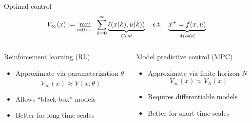 \documentclass[xcolor=dvipsnames,aspectratio=169]{beamer}
\begin{document}
\begin{frame}{Optimal control}
	\begin{equation*}
		V_{\infty}(x) := \min_{u(0),\dots} \ \sum_{k=0}^{\infty} 
		\underbrace{\ell(x(k),u(k))}_{Cost} \quad 
		\textnormal{s.t. } \ \underbrace{x^+ 
		= f(x,u)}_{Model}
	\end{equation*}
	\begin{columns}
		\begin{column}{0.45\linewidth}
			\begin{block}{Reinforcement learning (RL)}
				\begin{itemize}
					\item Approximate via parameterization $\theta$
					\begin{equation*}
						V_{\infty}(x) \approx \tilde{V}(x;\theta)
					\end{equation*}
					\item Allows ``black-box'' models
					\item Better for long time-scales
				\end{itemize}
			\end{block}
		\end{column}
		\begin{column}{0.45\linewidth}
			\begin{block}{Model predictive control (MPC)}
				\begin{itemize}
					\item Approximate via finite horizon $N$
					\begin{equation*}
						V_{\infty}(x) \approx V_{N}(x)
					\end{equation*}
					\item Requires differentiable models
					\item Better for short time-scales
				\end{itemize}
			\end{block}
		\end{column}
	\end{columns}
\end{frame}
\end{document}

